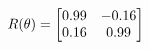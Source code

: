 \documentclass[preview]{standalone}
\begin{document}
\begin{align*}
\special{dvisvgm:raw <g id='unique000'>}R(\theta) = \begin{bmatrix}0.99 & -0.16\\0.16 & 0.99\end{bmatrix}\special{dvisvgm:raw </g>}
\end{align*}
\end{document}
